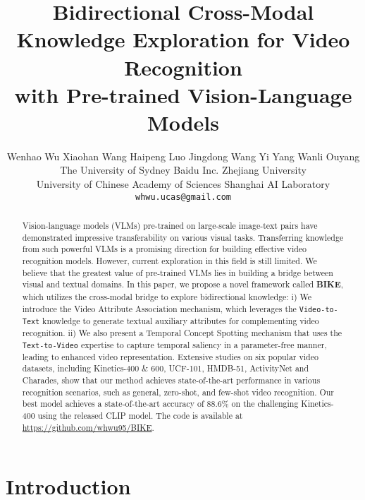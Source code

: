 \documentclass[10pt,twocolumn,letterpaper]{article}
\begin{document}
\title{Bidirectional Cross-Modal Knowledge Exploration for Video Recognition \\ with Pre-trained Vision-Language Models}



\author{Wenhao Wu\quad
Xiaohan Wang\quad
Haipeng Luo\quad
Jingdong Wang\quad
Yi Yang\quad
Wanli Ouyang\\
The University of Sydney \qquad Baidu Inc. \qquad Zhejiang University \\ 
University of Chinese Academy of Sciences  \qquad Shanghai AI Laboratory\\
{\tt\small whwu.ucas@gmail.com}
}

\maketitle

\begin{abstract}
Vision-language models (VLMs) pre-trained on large-scale image-text pairs have demonstrated impressive transferability on various visual tasks. Transferring knowledge from such powerful VLMs is a promising direction for building effective video recognition models.
However, current exploration in this field is still limited.
We believe that the greatest value of pre-trained VLMs lies in building a bridge between visual and textual domains.
In this paper, we propose a novel framework called \textbf{BIKE}, which utilizes the cross-modal bridge to explore bidirectional knowledge: i) We introduce the Video Attribute Association mechanism, which leverages the \texttt{Video-to-Text} knowledge to generate textual auxiliary attributes for complementing video recognition.
ii) We also present a Temporal Concept Spotting mechanism that uses the \texttt{Text-to-Video} expertise to capture temporal saliency in a parameter-free manner, leading to enhanced video representation.
Extensive studies on six popular video datasets, including Kinetics-400 \& 600, UCF-101, HMDB-51, ActivityNet and Charades, 
show that our method achieves state-of-the-art performance in various recognition scenarios, such as general, zero-shot, and few-shot video recognition. 
 Our best model achieves a state-of-the-art accuracy of 88.6\% on the challenging Kinetics-400 using the released CLIP model. The code is available at \url{https://github.com/whwu95/BIKE}.




\end{abstract} 
\section{Introduction}
\label{sec:intro}
\end{document}
